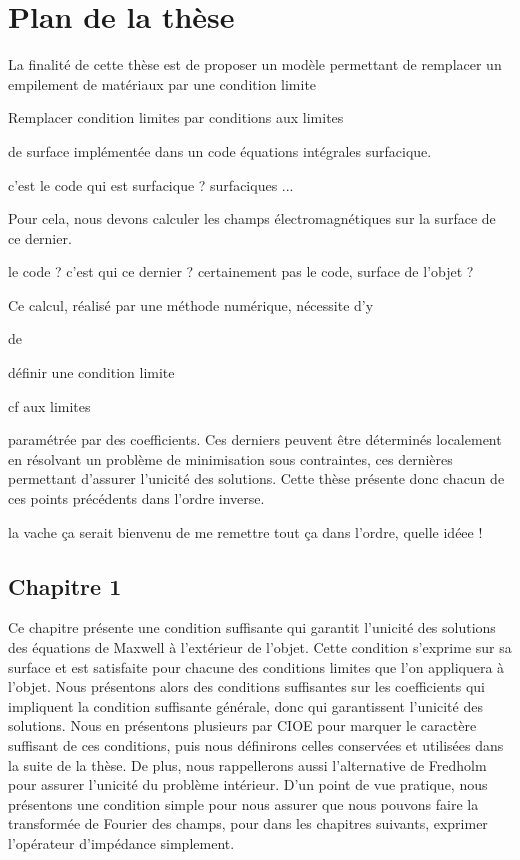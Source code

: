 \section*{Plan de la thèse}

La finalité de cette thèse est de proposer un modèle permettant de remplacer un empilement de matériaux par une condition limite
\begin{REM}
	Remplacer condition limites par conditions aux limites
\end{REM}
de surface implémentée dans un code équations intégrales surfacique.
\begin{REM}
	c'est le code qui est surfacique ? surfaciques ...
\end{REM}
Pour cela, nous devons calculer les champs électromagnétiques sur la surface de ce dernier.
\begin{REM}
	le code ? c'est qui ce dernier ? certainement pas le code, surface de l'objet ?
\end{REM}
Ce calcul, réalisé par une méthode numérique, nécessite d'y
\begin{REM}
	de
\end{REM}
 définir une condition limite
 \begin{REM}
	cf aux limites
\end{REM} paramétrée par des coefficients.
Ces derniers peuvent être déterminés localement en résolvant un problème de minimisation sous contraintes, ces dernières permettant d'assurer l'unicité des solutions.
Cette thèse présente donc chacun de ces points précédents dans l'ordre inverse.
\begin{REM}
	la vache ça serait bienvenu de me remettre tout ça dans l'ordre, quelle idéee !
\end{REM}

\subsection*{Chapitre 1}
Ce chapitre présente une condition suffisante qui garantit l'unicité des solutions des équations de Maxwell à l'extérieur de l'objet.
Cette condition s'exprime sur sa surface et est satisfaite pour chacune des conditions limites que l'on appliquera à l'objet. 
Nous présentons alors des conditions suffisantes sur les coefficients qui impliquent la condition suffisante générale, donc qui garantissent l'unicité des solutions.
Nous en présentons plusieurs par CIOE pour marquer le caractère suffisant de ces conditions, puis nous définirons celles conservées et utilisées dans la suite de la thèse.
De plus, nous rappellerons aussi l'alternative de Fredholm pour assurer l'unicité du problème intérieur. D'un point de vue pratique, nous présentons une condition simple pour nous assurer que nous pouvons faire la transformée de Fourier des champs, pour dans les chapitres suivants, exprimer l'opérateur d'impédance simplement.

